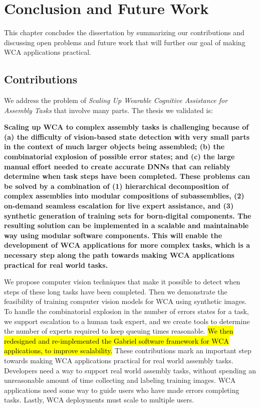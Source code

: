 \chapter{Conclusion and Future Work}\label{chap:conclusion}

This chapter concludes the dissertation by summarizing our contributions and
discussing open problems and future work that will further our goal of making
WCA applications practical.

\section{Contributions}

We address the problem of \textit{Scaling Up Wearable Cognitive Assistance for
  Assembly Tasks} that involve many parts.
The thesis we validated is:

\textbf{
  Scaling up WCA to complex assembly tasks is challenging because of
  (a) the difficulty of
  vision-based state detection with very small parts in the context of much
  larger objects being assembled; (b) the combinatorial explosion
  of possible error states; and (c) the large manual effort needed to create
  accurate DNNs that can reliably determine when task steps have been completed.
  These problems can be solved by a combination of (1) hierarchical
  decomposition of
  complex assemblies into modular compositions of subassemblies, (2) on-demand
  seamless
  escalation for live expert assistance, and (3) synthetic generation of
  training
  sets for born-digital components. The resulting solution can be implemented in
  a scalable and maintainable way using modular software components.
  This will enable the development of WCA applications for more complex tasks,
  which is a necessary step along the path towards making WCA applications
  practical for real world tasks.
}

We propose computer vision techniques that make it possible to detect when steps
of these long tasks have been completed.
Then we demonstrate the feasibility of training computer vision models for WCA
using synthetic images.
To handle the combinatorial explosion in the number of errors states for a task,
we support escalation to a human task expert, and we create tools to determine
the number of experts required to keep queuing times reasonable.
\hl{
  We then redesigned and re-implemented the Gabriel software framework for WCA
  applications, to improve scalability.
}
These contributions mark an important step towards making WCA applications
practical for real world assembly tasks.
Developers need a way to support real world assembly tasks, without spending an
unreasonable amount of time collecting and labeling training images.
WCA applications need some way to guide users who have made errors completing
tasks.
Lastly, WCA deployments must scale to multiple users.

